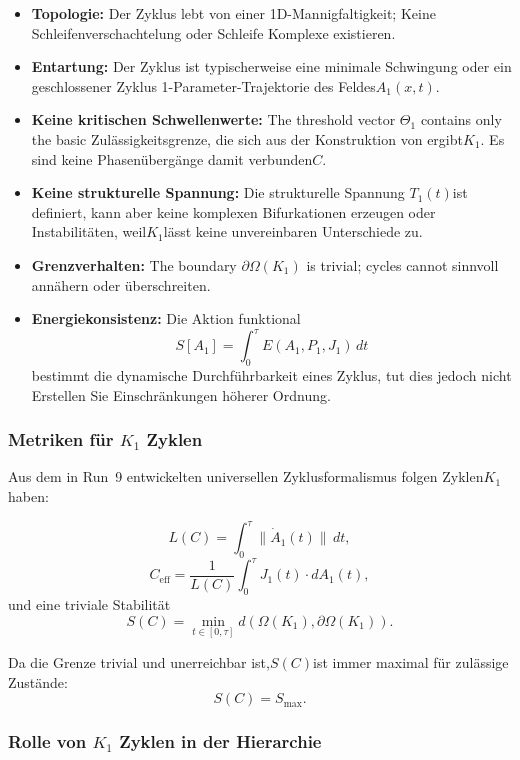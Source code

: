 \begin{itemize}
  \item \textbf{Topologie:}
Der Zyklus lebt von einer 1D-Mannigfaltigkeit; Keine Schleifenverschachtelung oder Schleife
Komplexe existieren.

  \item \textbf{Entartung:}
Der Zyklus ist typischerweise eine minimale Schwingung oder ein geschlossener Zyklus
1-Parameter-Trajektorie des Feldes$A_1(x,t)$.

  \item \textbf{Keine kritischen Schwellenwerte:}
        The threshold vector $\Theta_1$ contains only the basic
Zulässigkeitsgrenze, die sich aus der Konstruktion von ergibt$K_1$.
Es sind keine Phasenübergänge damit verbunden$C$.

  \item \textbf{Keine strukturelle Spannung:}
Die strukturelle Spannung
$T_1(t)$ist definiert, kann aber keine komplexen Bifurkationen erzeugen oder
Instabilitäten, weil$K_1$lässt keine unvereinbaren Unterschiede zu.

  \item \textbf{Grenzverhalten:}
        The boundary $\partial\Omega(K_1)$ is trivial; cycles cannot
sinnvoll annähern oder überschreiten.

  \item \textbf{Energiekonsistenz:}
Die Aktion funktional
        \[
          S[A_1] = \int_0^\tau E(A_1,P_1,J_1)\, dt
        \]
bestimmt die dynamische Durchführbarkeit eines Zyklus, tut dies jedoch nicht
Erstellen Sie Einschränkungen höherer Ordnung.
\end{itemize}

\subsubsection{Metriken für \texorpdfstring{$K_1$}{K_1} Zyklen}

Aus dem in Run~9 entwickelten universellen Zyklusformalismus folgen Zyklen$K_1$
haben:

\[
  L(C) = \int_0^\tau \| \dot{A}_1(t) \|\, dt,
\]
\[
  C_{\mathrm{eff}} =
    \frac{1}{L(C)} \int_0^\tau J_1(t)\cdot dA_1(t),
\]
und eine triviale Stabilität
\[
  S(C) = \min_{t\in[0,\tau]} d(\Omega(K_1),\partial\Omega(K_1)).
\]

Da die Grenze trivial und unerreichbar ist,$S(C)$ist immer
maximal für zulässige Zustände:
\[
  S(C) = S_{\max}.
\]

\subsubsection{Rolle von \texorpdfstring{$K_1$}{K_1} Zyklen in der Hierarchie}

